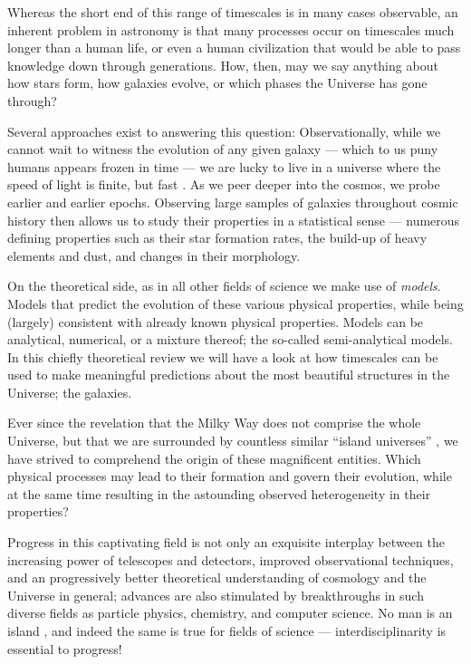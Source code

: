 \documentclass[useAMS]{aa}
\begin{document}
Whereas the short end of this range of timescales is in many cases observable, an inherent problem in astronomy is that many processes occur on timescales much longer than a human life, or even a human civilization that would be able to pass knowledge down through generations.
How, then, may we say anything about how stars form, how galaxies evolve, or which phases the Universe has gone through?

Several approaches exist to answering this question: Observationally, while we cannot wait to witness the evolution of any given galaxy --- which to us puny humans appears frozen in time --- we are lucky to live in a universe where the speed of light is finite, but fast%
.
As we peer deeper into the cosmos, we probe earlier and earlier epochs.
Observing large samples of galaxies throughout cosmic history then allows us to study their properties in a statistical sense --- numerous defining properties such as their star formation rates, the build-up of heavy elements and dust, and changes in their morphology.

On the theoretical side, as in all other fields of science we make use of \emph{models}.
Models that predict the evolution of these various physical properties, while being (largely) consistent with already known physical properties.
Models can be analytical, numerical, or a mixture thereof; the so-called semi-analytical models.
In this chiefly theoretical review we will have a look at how timescales can be used to make meaningful predictions about the most beautiful structures in the Universe; the galaxies.

Ever since the revelation that the Milky Way does not comprise the whole Universe, but that we are surrounded by countless similar ``island universes'' \citep[][see also info box~\ref{info:debate} on p.~\pageref{info:debate}]{Hubble1925}, we have strived to comprehend the origin of these magnificent entities.
Which physical processes may lead to their formation and govern their evolution, while at the same time resulting in the astounding observed heterogeneity in their properties?

Progress in this captivating field is not only an exquisite interplay between the increasing power of telescopes and detectors, improved observational techniques, and an progressively better theoretical understanding of cosmology and the Universe in general; advances are also stimulated by breakthroughs in such diverse fields as particle physics, chemistry, and computer science.
No man is an island \citep{Jovi1990}, and indeed the same is true for fields of science --- interdisciplinarity is essential to progress!
\end{document}
